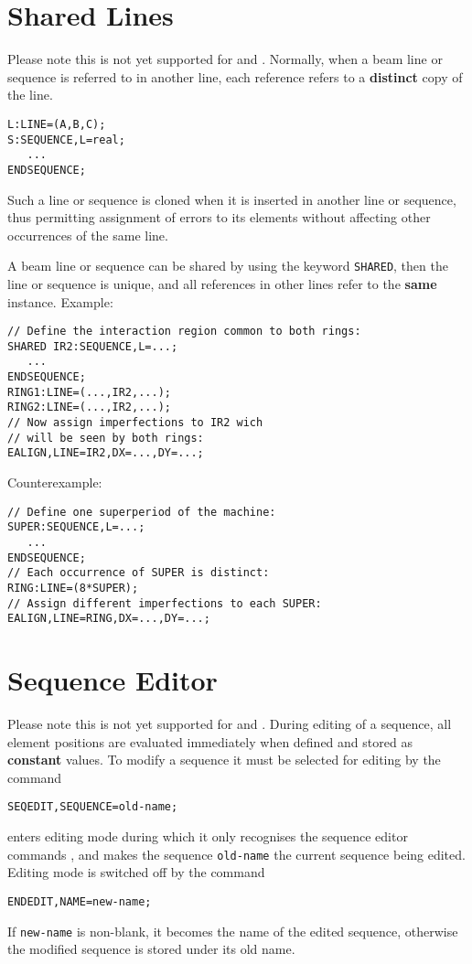 \section{Shared Lines}
\label{sec:seq-class}
Please note this is not yet supported for \noopalt and \noopalcycl.
Normally, when a beam line or sequence is referred to in another line,
each reference refers to a \textbf{distinct} copy of the line.
\begin{verbatim}
L:LINE=(A,B,C);
S:SEQUENCE,L=real;
   ...
ENDSEQUENCE;
\end{verbatim}
Such a line or sequence is cloned when it is inserted in another line
or sequence, thus permitting assignment of errors to its elements
without affecting other occurrences of the same line.

A beam line or sequence can be shared by using the keyword
\texttt{SHARED},
then the line or sequence is unique,
and all references in other lines refer to the \textbf{same} instance.
Example:
\begin{verbatim}
// Define the interaction region common to both rings:
SHARED IR2:SEQUENCE,L=...;
   ...
ENDSEQUENCE;
RING1:LINE=(...,IR2,...);
RING2:LINE=(...,IR2,...);
// Now assign imperfections to IR2 wich
// will be seen by both rings:
EALIGN,LINE=IR2,DX=...,DY=...;
\end{verbatim}
Counterexample:
\begin{verbatim}
// Define one superperiod of the machine:
SUPER:SEQUENCE,L=...;
   ...
ENDSEQUENCE;
// Each occurrence of SUPER is distinct:
RING:LINE=(8*SUPER);
// Assign different imperfections to each SUPER:
EALIGN,LINE=RING,DX=...,DY=...;
\end{verbatim}

\section{Sequence Editor}
\label{sec:editor}
Please note this is not yet supported for \noopalt and \noopalcycl.
During editing of a sequence, all element positions are evaluated
immediately when defined and stored as \textbf{constant} values.
To modify a sequence it must be selected for editing by the command
\begin{verbatim}
SEQEDIT,SEQUENCE=old-name;
\end{verbatim}
\opal enters editing mode during which it only recognises the
sequence editor commands ,
and makes the sequence \texttt{old-name} the current sequence being edited.
Editing mode is switched off by the command
\begin{verbatim}
ENDEDIT,NAME=new-name;
\end{verbatim}
If \texttt{new-name} is non-blank, it becomes the name of the edited sequence,
otherwise the modified sequence is stored under its old name.

